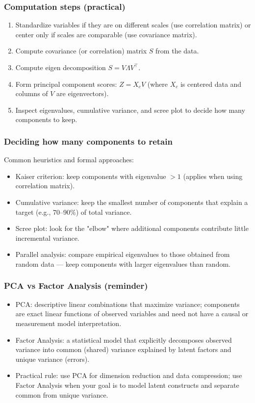 \documentclass[aspectratio=169]{beamer}
\begin{document}
\begin{frame}
    \frametitle{Computation steps (practical)}
    \begin{enumerate}
        \item Standardize variables if they are on different scales (use correlation matrix) or center only if scales are comparable (use covariance matrix). \pause
        \item Compute covariance (or correlation) matrix $S$ from the data. \pause
        \item Compute eigen decomposition $S=V\Lambda V^{\top}$. \pause
        \item Form principal component scores: $Z = X_c V$ (where $X_c$ is centered data and columns of $V$ are eigenvectors). \pause
        \item Inspect eigenvalues, cumulative variance, and scree plot to decide how many components to keep. \pause
    \end{enumerate}
\end{frame}

\begin{frame}
    \frametitle{Deciding how many components to retain}
    Common heuristics and formal approaches:
    \begin{itemize}
        \item Kaiser criterion: keep components with eigenvalue $>1$ (applies when using correlation matrix). \pause
        \item Cumulative variance: keep the smallest number of components that explain a target (e.g., 70--90\%) of total variance. \pause
        \item Scree plot: look for the "elbow" where additional components contribute little incremental variance. \pause
        \item Parallel analysis: compare empirical eigenvalues to those obtained from random data — keep components with larger eigenvalues than random. \pause
    \end{itemize}
\end{frame}


\begin{frame}
    \frametitle{PCA vs Factor Analysis (reminder)}
    \begin{itemize}
        \item PCA: descriptive linear combinations that maximize variance; components are exact linear functions of observed variables and need not have a causal or measurement model interpretation. \pause
        \item Factor Analysis: a statistical model that explicitly decomposes observed variance into common (shared) variance explained by latent factors and unique variance (errors). \pause
        \item Practical rule: use PCA for dimension reduction and data compression; use Factor Analysis when your goal is to model latent constructs and separate common from unique variance. \pause
    \end{itemize}
\end{frame}
\end{document}

